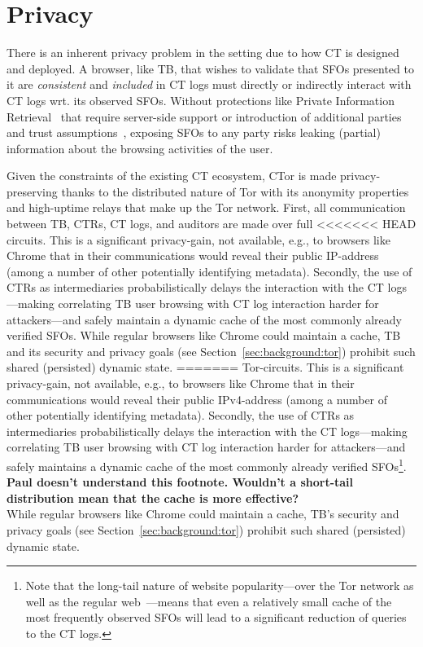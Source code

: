\section{Privacy} \label{sec:privacy}
There is an inherent privacy problem in the setting due to how CT is designed
and deployed. A browser, like TB, that wishes to validate that SFOs presented to
it are \emph{consistent} and \emph{included} in CT logs must directly or
indirectly interact with CT logs wrt. its observed SFOs. Without protections
like Private Information Retrieval~\cite{PIR} that require server-side support
or introduction of additional parties and trust
assumptions~\cite{lueks-and-goldberg,kales}, exposing SFOs to any party risks
leaking (partial) information about the browsing activities of the user.

Given the constraints of the existing CT ecosystem, CTor is made
privacy-preserving thanks to the distributed nature of Tor with its anonymity
properties and high-uptime relays that make up the Tor network. First, all
communication between TB, CTRs, CT logs, and auditors are made over full
<<<<<<< HEAD
circuits. This is a significant privacy-gain, not available, e.g., to browsers
like Chrome that in their communications would reveal their public IP-address
(among a number of other potentially identifying metadata). Secondly, the use of
CTRs as intermediaries probabilistically delays the interaction with the CT
logs---making correlating TB user browsing with CT log interaction harder for
attackers---and safely maintain a dynamic cache of the most commonly already
verified SFOs. While regular browsers like Chrome could maintain a cache, TB and
its security and privacy goals (see Section~\ref{sec:background:tor}) prohibit
such shared (persisted) dynamic state.
=======
Tor-circuits. This is a significant privacy-gain, not available, e.g., to
browsers like Chrome that in their communications would reveal their public
IPv4-address (among a number of other potentially identifying metadata).
Secondly, the use of CTRs as intermediaries probabilistically delays the
interaction with the CT logs---making correlating TB user browsing with CT log
interaction harder for attackers---and safely maintains a dynamic cache of the
most commonly already verified SFOs\footnote{Note that the long-tail nature of
website popularity---over the Tor network as well as the regular
web~\cite{mani}---means that even a relatively small cache of the most
frequently observed SFOs will lead to a significant reduction of queries to the
CT logs.}. {\bf \color{red} Paul doesn't understand this footnote. Wouldn't a short-tail distribution mean that the cache is more effective?}\\
While regular browsers like Chrome could maintain a cache, TB's
security and privacy goals (see Section~\ref{sec:background:tor}) 
prohibit such shared (persisted) dynamic state.


